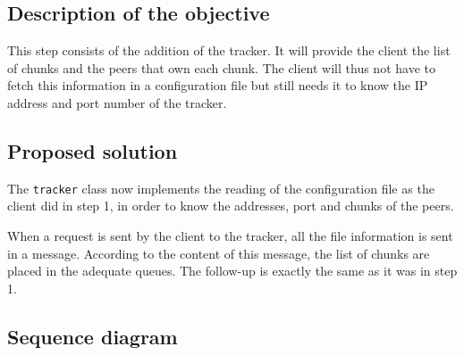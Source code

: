 \subsection{Description of the objective}

This step consists of the addition of the tracker. It will provide the client the list of chunks and the peers that own each chunk. The client will thus not have to fetch this information in a configuration file but still needs it to know the IP address and port number of the tracker.

\subsection{Proposed solution}

The \texttt{tracker} class now implements the reading of the configuration file as the client did in step 1, in order to know the addresses, port and chunks of the peers.

When a request is sent by the client to the tracker, all the file information is sent in a message. According to the content of this message, the list of chunks are placed in the adequate queues. The follow-up is exactly the same as it was in step 1. 

\subsection{Sequence diagram}